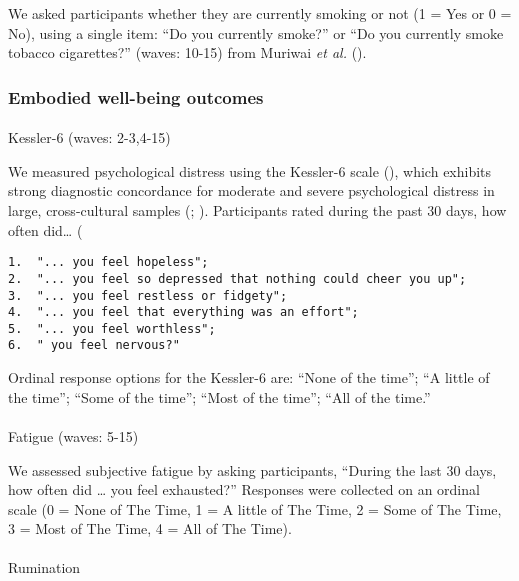 \documentclass[
  singlecolumn,
  9pt]{scrartcl}
\makeatletter
\let\oldparagraph\paragraph
\renewcommand{\paragraph}{
    \@ifstar
      \xxxParagraphStar
      \xxxParagraphNoStar
  }
\newcommand{\xxxParagraphStar}[1]{\oldparagraph*{#1}\mbox{}}
\newcommand{\xxxParagraphNoStar}[1]{\oldparagraph{#1}\mbox{}}
\makeatother
\begin{document}
We asked participants whether they are currently smoking or not (1 = Yes
or 0 = No), using a single item: ``Do you currently smoke?'' or ``Do you
currently smoke tobacco cigarettes?'' (waves: 10-15) from Muriwai
\emph{et al.} ().

\subsubsection{Embodied well-being
outcomes}\label{embodied-well-being-outcomes}

\paragraph{Kessler-6 (waves: 2-3,4-15)}\label{kessler-6-waves-2-34-15}

We measured psychological distress using the Kessler-6 scale
(), which exhibits
strong diagnostic concordance for moderate and severe psychological
distress in large, cross-cultural samples
(;
).
Participants rated during the past 30 days, how often did\ldots{} (

\begin{verbatim}
1.  "... you feel hopeless";
2.  "... you feel so depressed that nothing could cheer you up";
3.  "... you feel restless or fidgety";
4.  "... you feel that everything was an effort";
5.  "... you feel worthless";
6.  " you feel nervous?"
\end{verbatim}

Ordinal response options for the Kessler-6 are: ``None of the time'';
``A little of the time''; ``Some of the time''; ``Most of the time'';
``All of the time.''

\paragraph{Fatigue (waves: 5-15)}\label{fatigue-waves-5-15}

We assessed subjective fatigue by asking participants, ``During the last
30 days, how often did \ldots{} you feel exhausted?'' Responses were
collected on an ordinal scale (0 = None of The Time, 1 = A little of The
Time, 2 = Some of The Time, 3 = Most of The Time, 4 = All of The Time).

\paragraph{Rumination}\label{rumination}
\end{document}
